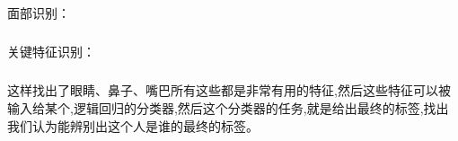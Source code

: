\documentclass{article}
\begin{document}
\begin{CJK}{UTF8}{gbsn}
\begin{figure}[H]
\label{fig:2272}
\end{figure}
\subparagraph{}
面部识别：
\begin{figure}[H]
\label{fig:2273}
\end{figure}
\subparagraph{}
关键特征识别：
\begin{figure}[H]
\label{fig:2274}
\end{figure}
\subparagraph{}
这样找出了眼睛、鼻子、嘴巴所有这些都是非常有用的特征,然后这些特征可以被输入给某个,逻辑回归的分类器,然后这个分类器的任务,就是给出最终的标签,找出我们认为能辨别出这个人是谁的最终的标签。
\begin{figure}[H]
\label{fig:2276}
\end{figure}
\begin{figure}[H]
\label{fig:2275}
\end{figure}
\begin{figure}[H]
\label{fig:2279}
\end{figure}
\begin{figure}[H]
\label{fig:2280}
\end{figure}
\begin{figure}[H]
\label{fig:2281}
\end{figure}
\begin{figure}[H]
\label{fig:2282}
\end{figure}
\begin{figure}[H]
\label{fig:2283}
\end{figure}
\begin{figure}[H]
\label{fig:2284}
\end{figure}
\begin{figure}[H]
\label{fig:2287}
\end{figure}
\begin{figure}[H]
\label{fig:2285}
\end{figure}
\begin{figure}[H]
\label{fig:2286}
\end{figure}


\end{CJK}
\end{document}

